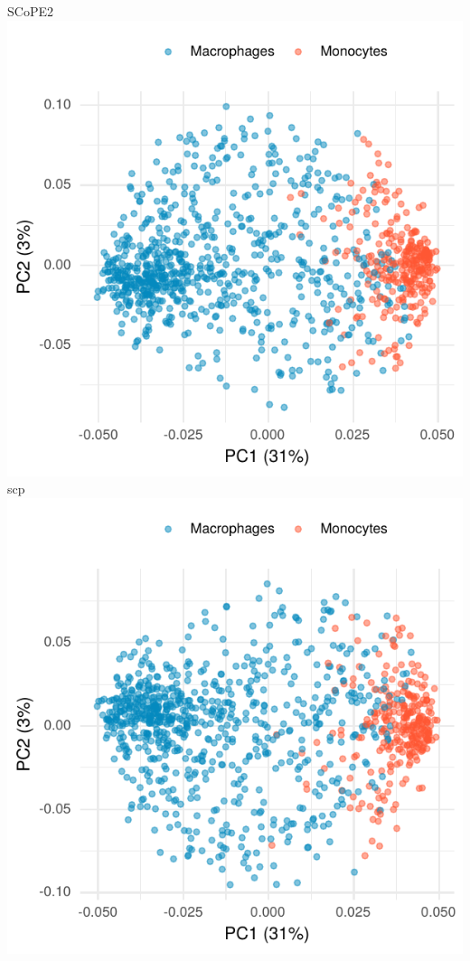\documentclass{beamer}
\newcommand{\hcode}[2][lgray]{{\ttfamily\color{vdgray}\colorbox{#1}{#2}}}
\begin{document}
\begin{frame}[allowframebreaks]
  \vfill
  \begin{columns}
    SCoPE2\\
    \includegraphics[width=\linewidth]{figs/wPCA_SCoPE2.pdf}
    \hcode{scp}\\
    \includegraphics[width=\linewidth]{figs/wPCA_scp.pdf}
  \end{columns}
\end{frame}
\end{document}
